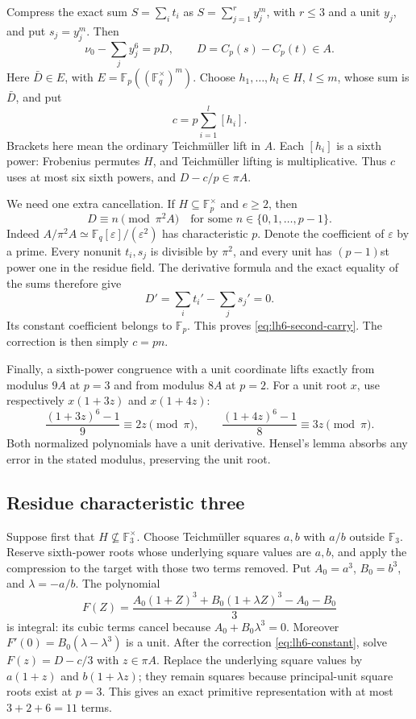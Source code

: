 \documentclass[11pt,reqno]{amsart}
\numberwithin{equation}{section}
\theoremstyle{definition}
\begin{document}
Compress the exact sum $S=\sum_i t_i$ as
$S=\sum_{j=1}^r y_j^m$, with $r\le3$ and a unit $y_j$, and put
$s_j=y_j^m$. Then
\begin{equation}\label{eq:lh6-carry}
 \nu_0-\sum_jy_j^6=pD,
 \qquad D=C_p(s)-C_p(t)\in A.
\end{equation}
Here $\bar D\in E$, with $E=\mathbb F_p((\mathbb F_q^\times)^m)$.
Choose $h_1,\ldots,h_l\in H$, $l\le m$, whose sum is $\bar D$,
and put
\begin{equation}\label{eq:lh6-constant}
 c=p\sum_{i=1}^l[h_i].
\end{equation}
Brackets here mean the ordinary Teichm\"uller lift in $A$.
Each $[h_i]$ is a sixth power: Frobenius permutes $H$, and
Teichm\"uller lifting is multiplicative. Thus $c$ uses at most six
sixth powers, and $D-c/p\in\pi A$.

We need one extra cancellation. If $H\subseteq\mathbb F_p^\times$
and $e\ge2$, then
\begin{equation}\label{eq:lh6-second-carry}
 D\equiv n\pmod{\pi^2A}
 \quad\text{for some }n\in\{0,1,\ldots,p-1\}.
\end{equation}
Indeed $A/\pi^2A\simeq\mathbb F_q[\varepsilon]/(\varepsilon^2)$
has characteristic $p$. Denote the coefficient of $\varepsilon$
by a prime. Every nonunit $t_i,s_j$ is divisible by $\pi^2$, and
every unit has $(p-1)$st power one in the residue field. The derivative
formula and the exact equality of the sums therefore give
\[
 D'=\sum_i t_i'-\sum_j s_j'=0.
\]
Its constant coefficient belongs to $\mathbb F_p$. This proves
\eqref{eq:lh6-second-carry}. The correction is then simply $c=pn$.

Finally, a sixth-power congruence with a unit coordinate lifts exactly
from modulus $9A$ at $p=3$ and from modulus $8A$ at $p=2$.
For a unit root $x$, use respectively $x(1+3z)$ and $x(1+4z)$:
\[
 \frac{(1+3z)^6-1}{9}\equiv2z\pmod\pi,
 \qquad
 \frac{(1+4z)^6-1}{8}\equiv3z\pmod\pi.
\]
Both normalized polynomials have a unit derivative. Hensel's lemma
absorbs any error in the stated modulus, preserving the unit root.

\subsection{Residue characteristic three}

Suppose first that $H\nsubseteq\mathbb F_3^\times$. Choose
Teichm\"uller squares $a,b$ with $a/b$ outside $\mathbb F_3$.
Reserve sixth-power roots whose underlying square values are $a,b$,
and apply the compression to the target with those two terms removed.
Put $A_0=a^3$, $B_0=b^3$, and $\lambda=-a/b$. The polynomial
\[
 F(Z)=\frac{A_0(1+Z)^3+B_0(1+\lambda Z)^3-A_0-B_0}{3}
\]
is integral: its cubic terms cancel because $A_0+B_0\lambda^3=0$.
Moreover $F'(0)=B_0(\lambda-\lambda^3)$ is a unit.
After the correction \eqref{eq:lh6-constant}, solve
$F(z)=D-c/3$ with $z\in\pi A$. Replace the underlying square
values by $a(1+z)$ and $b(1+\lambda z)$; they remain squares because
principal-unit square roots exist at $p=3$. This gives an exact
primitive representation with at most $3+2+6=11$ terms.
\end{document}
